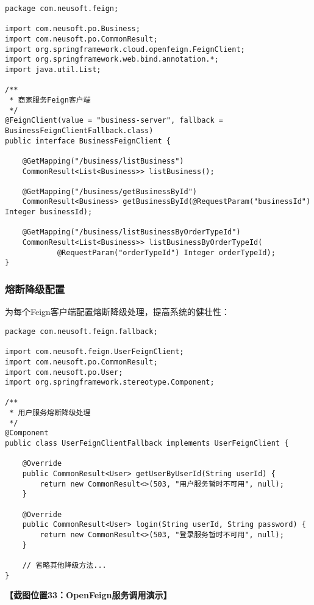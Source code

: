 \documentclass[a4paper,12pt]{article}
\begin{document}
\begin{lstlisting}[caption=商家服务Feign接口]
package com.neusoft.feign;

import com.neusoft.po.Business;
import com.neusoft.po.CommonResult;
import org.springframework.cloud.openfeign.FeignClient;
import org.springframework.web.bind.annotation.*;
import java.util.List;

/**
 * 商家服务Feign客户端
 */
@FeignClient(value = "business-server", fallback = BusinessFeignClientFallback.class)
public interface BusinessFeignClient {
    
    @GetMapping("/business/listBusiness")
    CommonResult<List<Business>> listBusiness();
    
    @GetMapping("/business/getBusinessById")
    CommonResult<Business> getBusinessById(@RequestParam("businessId") Integer businessId);
    
    @GetMapping("/business/listBusinessByOrderTypeId")
    CommonResult<List<Business>> listBusinessByOrderTypeId(
            @RequestParam("orderTypeId") Integer orderTypeId);
}
\end{lstlisting}

\subsubsection{熔断降级配置}

为每个Feign客户端配置熔断降级处理，提高系统的健壮性：

\begin{lstlisting}[caption=用户服务熔断降级]
package com.neusoft.feign.fallback;

import com.neusoft.feign.UserFeignClient;
import com.neusoft.po.CommonResult;
import com.neusoft.po.User;
import org.springframework.stereotype.Component;

/**
 * 用户服务熔断降级处理
 */
@Component
public class UserFeignClientFallback implements UserFeignClient {
    
    @Override
    public CommonResult<User> getUserByUserId(String userId) {
        return new CommonResult<>(503, "用户服务暂时不可用", null);
    }
    
    @Override
    public CommonResult<User> login(String userId, String password) {
        return new CommonResult<>(503, "登录服务暂时不可用", null);
    }
    
    // 省略其他降级方法...
}
\end{lstlisting}

\textbf{【截图位置33：OpenFeign服务调用演示】}
\end{document}
